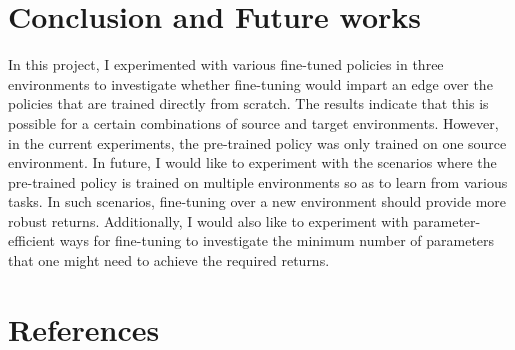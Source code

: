 \documentclass[10pt,a4paper]{article}
\begin{document}
\section{Conclusion and Future works}
In this project, I experimented with various fine-tuned policies in three environments to investigate whether fine-tuning would
impart an edge over the policies that are trained directly from scratch. The results indicate that this is possible for a certain combinations
of source and target environments. However, in the current experiments, the pre-trained policy was only trained on one source environment. In future,
I would like to experiment with the scenarios where the pre-trained policy is trained on multiple environments so as to learn from various tasks.
In such scenarios, fine-tuning over a new environment should provide more robust returns. Additionally, I would also like to experiment with
parameter-efficient ways for fine-tuning to investigate the minimum number of parameters that one might need to achieve the required returns.

\section{References}



\end{document}
